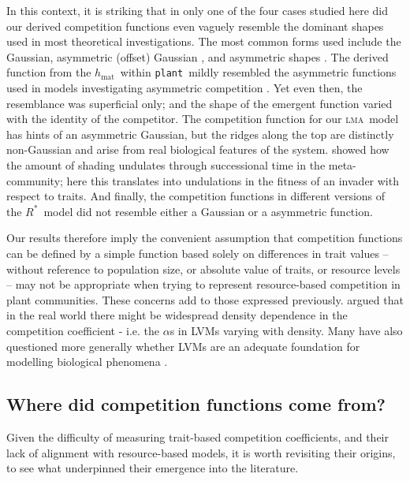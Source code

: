 \documentclass[a4paper,11pt]{article}
\newcommand{\Rstar}{\ensuremath{R^*}}
\newcommand{\plant}{{\tt plant}}
\newcommand{\hmat}{\ensuremath{h_{\text{mat}}}}
\newcommand{\lma}{\textsc{lma}}
\begin{document}
In this context, it is striking that in only one of the four cases studied here did our derived competition functions even vaguely resemble the dominant shapes used in most theoretical investigations. The most common forms used include the Gaussian, asymmetric (offset) Gaussian \citep{Roughgarden-1979}, and asymmetric shapes \citep[e.g.][]{Kisdi-1999, Law-1997}. The derived function from the \hmat\ within \plant\ mildly resembled the asymmetric functions used in models investigating asymmetric competition \citep{Law-1997, Geritz-1999, Kisdi-1999, Calcagno-2006}. Yet even then, the resemblance was superficial only; and the shape of the emergent function varied with the identity of the competitor. The competition function for our \lma\ model has hints of an asymmetric Gaussian, but the ridges along the top are distinctly non-Gaussian and arise from real biological features of the system. \citet{Falster-2011} showed how the amount of shading undulates through successional time in the meta-community; here this translates into undulations in the fitness of an invader with respect to traits. And finally, the competition functions in different versions of the \Rstar\ model did not resemble either a Gaussian or a asymmetric function.

Our results therefore imply the convenient assumption that competition functions can be defined by a simple function based solely on differences in trait values -- without reference to population size, or absolute value of traits, or resource levels -- may not be appropriate when trying to represent resource-based competition in plant communities. These concerns add to those expressed previously. \citet{Abrams-1980} argued that in the real world there might be widespread density dependence in the competition coefficient - i.e. the $\alpha$s in LVMs varying with density. Many have also questioned more generally whether LVMs are an adequate foundation for modelling biological phenomena  \citep[e.g.][]{Andrewartha-1953, Neill-1974, Abrams-1975, Wangersky-1978,Abrams-1980, Tilman-1987, Abrams-2008}.

\subsection{Where did competition functions come from?}

Given the difficulty of  measuring trait-based competition coefficients, and their lack of alignment with resource-based models, it is worth revisiting their origins, to see what underpinned their emergence into the literature.
\end{document}
